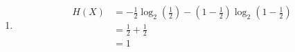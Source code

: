 \documentclass[11pt]{article}
\newcommand{\logbin}{\log_2}
\theoremstyle{definition}
\begin{document}
\begin{enumerate}
\begin{proof}
    \end{proof}
  \item
      \begin{equation*}
      \begin{aligned}
        H(X) &= -\frac{1}{2}\logbin (\frac{1}{2}) - (1 - \frac{1}{2})\logbin (1 - \frac{1}{2}) \\
             &= \frac{1}{2} + \frac{1}{2} \\
             &= 1
      \end{aligned}
      \end{equation*}
\end{enumerate}
\end{document}
